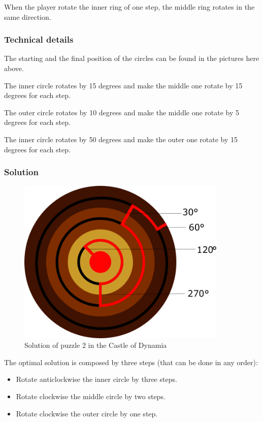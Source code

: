 When the player rotate the inner ring of one step, the middle ring rotates in the same direction.

\subsubsection*{Technical details}
The starting and the final position of the circles can be found in the pictures here above.

The inner circle rotates by 15 degrees and make the middle one rotate by 15 degrees for each step.

The outer circle rotates by 10 degrees and make the middle one rotate by 5 degrees for each step.

The inner circle rotates by 50 degrees and make the outer one rotate by 15 degrees for each step.

\subsubsection*{Solution}
\begin{figure}[H]
  \centering
  \includegraphics[width=10cm]{Images/Puzzles/castleOfDynamia2Solution}
  \caption{Solution of puzzle 2 in the Castle of Dynamia}
\end{figure}

The optimal solution is composed by three steps (that can be done in any order):
\begin{itemize}
	\item Rotate anticlockwise the inner circle by three steps.
	\item Rotate clockwise the middle circle by two steps.
	\item Rotate clockwise the outer circle by one step.
\end{itemize}

